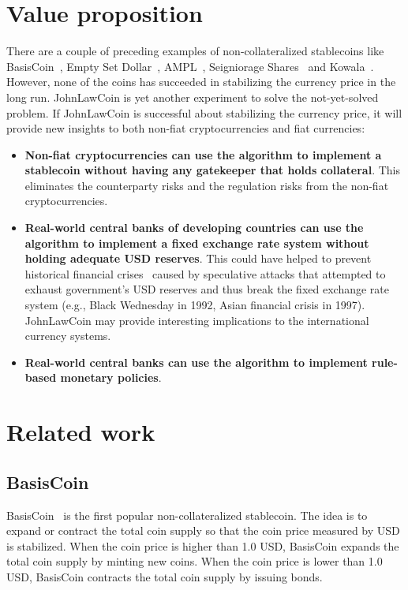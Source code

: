 \documentclass[dvipdfmx,a4paper]{article}
\begin{document}
\section{Value proposition}

There are a couple of preceding examples of non-collateralized stablecoins like BasisCoin~\cite{basiscoin}, Empty Set Dollar~\cite{emptysetdollar}, AMPL~\cite{ampl}, Seigniorage Shares~\cite{seigniorage} and Kowala~\cite{kowala}. However, none of the coins has succeeded in stabilizing the currency price in the long run. JohnLawCoin is yet another experiment to solve the not-yet-solved problem. If JohnLawCoin is successful about stabilizing the currency price, it will provide new insights to both non-fiat cryptocurrencies and fiat currencies:

\begin{itemize}
\item \textbf{Non-fiat cryptocurrencies can use the algorithm to implement a stablecoin without having any gatekeeper that holds collateral}. This eliminates the counterparty risks and the regulation risks from the non-fiat cryptocurrencies.
\item \textbf{Real-world central banks of developing countries can use the algorithm to implement a fixed exchange rate system without holding adequate USD reserves}. This could have helped to prevent historical financial crises~\cite{ferguson2008ascent} caused by speculative attacks that attempted to exhaust government's USD reserves and thus break the fixed exchange rate system (e.g., Black Wednesday in 1992, Asian financial crisis in 1997). JohnLawCoin may provide interesting implications to the international currency systems.
\item \textbf{Real-world central banks can use the algorithm to implement rule-based monetary policies}.
\end{itemize}

\section{Related work}

\subsection{BasisCoin}

BasisCoin~\cite{basiscoin} is the first popular non-collateralized stablecoin. The idea is to expand or contract the total coin supply so that the coin price measured by USD is stabilized. When the coin price is higher than 1.0 USD, BasisCoin expands the total coin supply by minting new coins. When the coin price is lower than 1.0 USD, BasisCoin contracts the total coin supply by issuing bonds.
\end{document}

